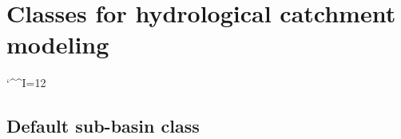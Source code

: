 \chapter{Classes for hydrological catchment modeling} \label{chap:classes:catchmod}

\catcode`\^^I=12 %
\DTLsetseparator{	}%

%
\newcommand{\tableOfMembers}[4]{%
\DTLloadrawdb{#1}{#2}
\begin{center}
\begin{longtable}{llll}
\caption{#3 \label{#4}} \\
\hline
\fmtClassDesc\bfseries Type & \fmtClassDesc\bfseries Name & \fmtClassDesc\bfseries Description & \fmtClassDesc\bfseries Unit\\
\hline
\endfirsthead
\multicolumn{4}{c}%
{\tablename\ \thetable\ -- \textit{Continued from previous page}} \\
\hline
\fmtClassDesc\bfseries Type & \fmtClassDesc\bfseries Name & \fmtClassDesc\bfseries Description & \fmtClassDesc\bfseries Unit\\
\hline
\endhead
\hline \multicolumn{4}{r}{\textit{Continued on next page}} \\
\endfoot
\hline
\endlastfoot
\DTLforeach{#1}
{\membertype=type,\membername=name,\memberdescr=description,\memberunit=unit}
{%
  \DTLiffirstrow{}{\\}%
  \fmtClassDesc \membertype & \fmtClassDesc \membername & \fmtClassDesc \memberdescr & \fmtClassDesc \memberunit%
}%
\end{longtable}
\end{center}
}


\section{Default sub-basin class} \label{sec:classes:catchmod:subbasin-default}

